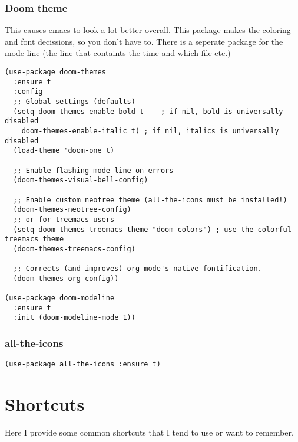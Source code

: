 \documentclass[11pt]{article}
\begin{document}
\subsubsection{Doom theme}
\label{sec:org9ef00b5}
This causes emacs to look a lot better overall. \href{https://github.com/hlissner/emacs-doom-themes}{This package} makes the coloring and font decissions, so you don't have to. There is a seperate package for the mode-line (the line that containts the time and which file etc.)
\begin{verbatim}
(use-package doom-themes
  :ensure t
  :config
  ;; Global settings (defaults)
  (setq doom-themes-enable-bold t    ; if nil, bold is universally disabled
	doom-themes-enable-italic t) ; if nil, italics is universally disabled
  (load-theme 'doom-one t)

  ;; Enable flashing mode-line on errors
  (doom-themes-visual-bell-config)

  ;; Enable custom neotree theme (all-the-icons must be installed!)
  (doom-themes-neotree-config)
  ;; or for treemacs users
  (setq doom-themes-treemacs-theme "doom-colors") ; use the colorful treemacs theme
  (doom-themes-treemacs-config)

  ;; Corrects (and improves) org-mode's native fontification.
  (doom-themes-org-config))

(use-package doom-modeline
  :ensure t
  :init (doom-modeline-mode 1))
\end{verbatim}
\subsubsection{all-the-icons}
\label{sec:org0556c55}
\begin{verbatim}
(use-package all-the-icons :ensure t)
\end{verbatim}
\section{Shortcuts}
\label{sec:org5772c86}
Here I provide some common shortcuts that I tend to use or want to remember. 
\end{document}
